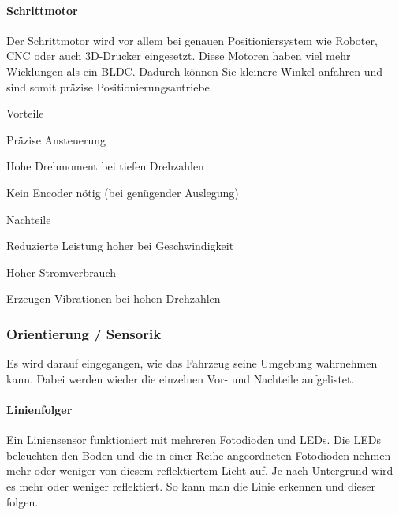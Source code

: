\documentclass[../main.tex]{subfiles}
\begin{document}
\paragraph{Schrittmotor}

Der Schrittmotor wird vor allem bei genauen Positioniersystem wie Roboter, CNC oder auch 3D-Drucker eingesetzt. Diese Motoren haben viel mehr Wicklungen als ein BLDC. Dadurch können Sie kleinere Winkel anfahren und sind somit präzise Positionierungsantriebe. 

\begin{minipage}[t]{0.48\textwidth}
\begin{items}
  \item [Vorteile]
  \item Präzise Ansteuerung
  \item Hohe Drehmoment bei tiefen Drehzahlen
  \item Kein Encoder nötig (bei genügender Auslegung)
\end{items}
\end{minipage}
\hfill
\begin{minipage}[t]{0.48\textwidth}
\begin{items}
  \item [Nachteile]
  \item Reduzierte Leistung hoher bei Geschwindigkeit
  \item Hoher Stromverbrauch
  \item Erzeugen Vibrationen bei hohen Drehzahlen
\end{items}
\end{minipage}

\subsubsection{Orientierung / Sensorik}

Es wird darauf eingegangen, wie das Fahrzeug seine Umgebung wahrnehmen kann. Dabei werden wieder die einzelnen Vor- und Nachteile aufgelistet.

\paragraph{Linienfolger}
Ein Liniensensor funktioniert mit mehreren Fotodioden und LEDs. Die LEDs beleuchten den Boden und die in einer Reihe angeordneten Fotodioden nehmen mehr oder weniger von diesem reflektiertem Licht auf. Je nach Untergrund wird es mehr oder weniger reflektiert. So kann man die Linie erkennen und dieser folgen.
 
\end{document}
